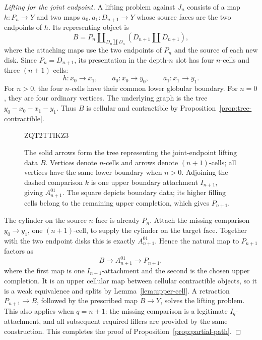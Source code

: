 \documentclass[11pt,letterpaper]{article}
\numberwithin{equation}{section}
\theoremstyle{plain}
\theoremstyle{definition}
\theoremstyle{remark}
\begin{document}
\begin{proof}[Lifting for the joint endpoint]
A lifting problem against \(J_n\) consists of a map
\(h:P_n\to Y\) and two maps \(a_0,a_1:D_{n+1}\to Y\)
whose source faces are the two endpoints of \(h\).  Its representing
object is
\begin{equation}\label{eq:partial-path-tree-domain}
 B=P_n\amalg_{D_n\amalg D_n}(D_{n+1}\amalg D_{n+1}),
\end{equation}
where the attaching maps use the two endpoints of \(P_n\) and
the source of each new disk.  Since \(P_n=D_{n+1}\), its
presentation in the depth-\(n\) slot has four \(n\)-cells and
three \((n+1)\)-cells:
\[
 h:x_0\longrightarrow x_1,\qquad
 a_0:x_0\longrightarrow y_0,\qquad
 a_1:x_1\longrightarrow y_1.
\]
For \(n>0\), the four \(n\)-cells have their common lower
globular boundary.  For \(n=0\), they are four ordinary vertices.
The underlying graph is the tree \(y_0-x_0-x_1-y_1\).
Thus \(B\) is cellular and contractible by
Proposition~\ref{prop:tree-contractible}.

\begin{figure}

ZQT2TTIKZ3
\caption{The solid arrows form the tree representing the joint-endpoint
lifting data \(B\).  Vertices denote \(n\)-cells and arrows denote
\((n+1)\)-cells; all vertices have the same lower boundary when \(n>0\).
Adjoining the dashed comparison \(k\) is one upper boundary attachment
\(I_{n+1}\), giving \(A_{n+1}^{01}\).  The square depicts boundary
data; its higher filling cells belong to the remaining upper completion,
which gives \(P_{n+1}\).}
\label{fig:joint-endpoints}
\end{figure}


The cylinder on the source \(n\)-face is already \(P_n\).
Attach the missing comparison \(y_0\to y_1\), one
\((n+1)\)-cell, to supply the cylinder on the target face.  Together
with the two endpoint disks this is exactly
\(A_{n+1}^{01}\).  Hence the natural map to \(P_{n+1}\)
factors as
\[
                 B\longrightarrow A_{n+1}^{01}
                        \longrightarrow P_{n+1},
\]
where the first map is one \(I_{n+1}\)-attachment and the second
is the chosen upper completion.  It is an upper cellular map between
cellular contractible objects, so it is a weak equivalence and splits
by Lemma~\ref{lem:upper-cell}.  A retraction
\(P_{n+1}\to B\), followed by the prescribed map \(B\to Y\),
solves the lifting problem.  This also applies when \(q=n+1\):
the missing comparison is a legitimate \(I_q\)-attachment, and
all subsequent required fillers are provided by the same construction.
This completes the proof of Proposition~\ref{prop:partial-path}.
\end{proof}
\end{document}
